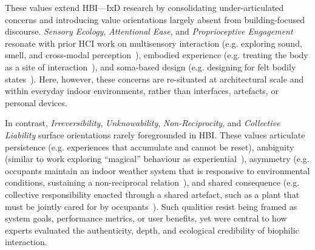 These values extend HBI---IxD research by consolidating under-articulated concerns and introducing value orientations largely absent from building-focused discourse. \emph{Sensory Ecology}, \emph{Attentional Ease}, and \emph{Proprioceptive Engagement} resonate with prior HCI work on multisensory interaction (e.g. exploring sound, smell, and cross-modal perception~\cite{andres2023human,becsevli2024smell}), embodied experience (e.g. treating the body as a site of interaction~\cite{van2018skin}), and soma-based design (e.g. designing for felt bodily states~\cite{damen2021office}). Here, however, these concerns are re-situated at architectural scale and within everyday indoor environments, rather than interfaces, artefacts, or personal devices.

In contrast, \emph{Irreversibility}, \emph{Unknowability}, \emph{Non-Reciprocity}, and \emph{Collective Liability} surface orientations rarely foregrounded in HBI. These values articulate persistence (e.g. experiences that accumulate and cannot be reset), ambiguity (similar to work exploring ``magical'' behaviour as experiential~\cite{economidou2021moving}), asymmetry (e.g. occupants maintain an indoor weather system that is responsive to environmental conditions, sustaining a non-reciprocal relation~\cite{gaver2013indoor}), and shared consequence (e.g. collective responsibility enacted through a shared artefact, such as a plant that must be jointly cared for by occupants~\cite{loh2010please}). Such qualities resist being framed as system goals, performance metrics, or user benefits, yet were central to how experts evaluated the authenticity, depth, and ecological credibility of biophilic interaction.

